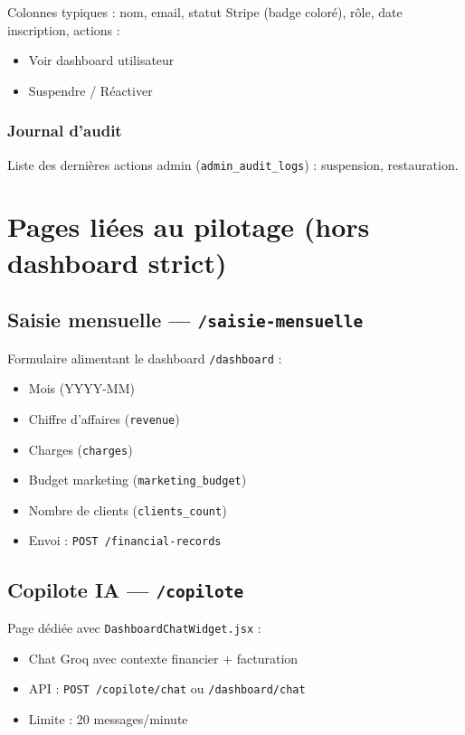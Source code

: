 \documentclass[11pt,a4paper]{report}
\newcommand{\filepath}[1]{\texttt{\small #1}}
\newcommand{\route}[1]{\texttt{\small #1}}
\begin{document}
Colonnes typiques : nom, email, statut Stripe (badge coloré), rôle, date inscription, actions :
\begin{itemize}[leftmargin=1.5em]
    \item Voir dashboard utilisateur
    \item Suspendre / Réactiver
\end{itemize}

\subsection{Journal d'audit}

Liste des dernières actions admin (\texttt{admin\_audit\_logs}) : suspension, restauration.

\chapter{Pages liées au pilotage (hors dashboard strict)}

\section{Saisie mensuelle — \route{/saisie-mensuelle}}

Formulaire alimentant le dashboard \route{/dashboard} :

\begin{itemize}[leftmargin=1.5em]
    \item Mois (YYYY-MM)
    \item Chiffre d'affaires (\texttt{revenue})
    \item Charges (\texttt{charges})
    \item Budget marketing (\texttt{marketing\_budget})
    \item Nombre de clients (\texttt{clients\_count})
    \item Envoi : \route{POST /financial-records}
\end{itemize}

\section{Copilote IA — \route{/copilote}}

Page dédiée avec \filepath{DashboardChatWidget.jsx} :
\begin{itemize}[leftmargin=1.5em]
    \item Chat Groq avec contexte financier + facturation
    \item API : \route{POST /copilote/chat} ou \route{/dashboard/chat}
    \item Limite : 20 messages/minute
\end{itemize}
\end{document}

